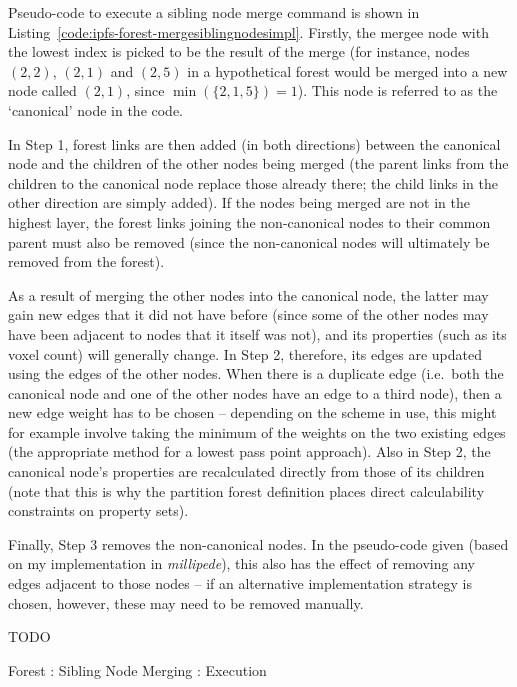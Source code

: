 Pseudo-code to execute a sibling node merge command is shown in Listing~\ref{code:ipfs-forest-mergesiblingnodesimpl}. Firstly, the mergee node with the lowest index is picked to be the result of the merge (for instance, nodes $(2,2)$, $(2,1)$ and $(2,5)$ in a hypothetical forest would be merged into a new node called $(2,1)$, since $\min(\{2,1,5\}) = 1$). This node is referred to as the `canonical' node in the code.

In Step 1, forest links are then added (in both directions) between the canonical node and the children of the other nodes being merged (the parent links from the children to the canonical node replace those already there; the child links in the other direction are simply added). If the nodes being merged are not in the highest layer, the forest links joining the non-canonical nodes to their common parent must also be removed (since the non-canonical nodes will ultimately be removed from the forest).

As a result of merging the other nodes into the canonical node, the latter may gain new edges that it did not have before (since some of the other nodes may have been adjacent to nodes that it itself was not), and its properties (such as its voxel count) will generally change. In Step 2, therefore, its edges are updated using the edges of the other nodes. When there is a duplicate edge (i.e.~both the canonical node and one of the other nodes have an edge to a third node), then a new edge weight has to be chosen -- depending on the scheme in use, this might for example involve taking the minimum of the weights on the two existing edges (the appropriate method for a lowest pass point approach). Also in Step 2, the canonical node's properties are recalculated directly from those of its children (note that this is why the partition forest definition places direct calculability constraints on property sets).

Finally, Step 3 removes the non-canonical nodes. In the pseudo-code given (based on my implementation in \emph{millipede}), this also has the effect of removing any edges adjacent to those nodes -- if an alternative implementation strategy is chosen, however, these may need to be removed manually.

TODO

\begin{stulisting}[p]
\caption{Forest : Sibling Node Merging : Execution}
\label{code:ipfs-forest-mergesiblingnodesimpl}

\end{stulisting}

